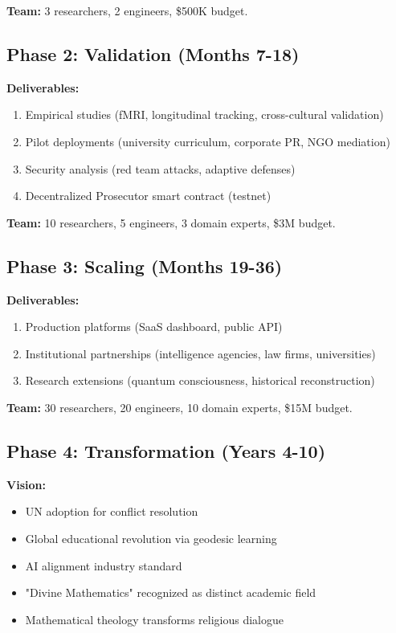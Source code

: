 \documentclass[11pt,a4paper]{article}
\theoremstyle{definition}
\theoremstyle{remark}
\begin{document}
\textbf{Team:} 3 researchers, 2 engineers, \$500K budget.

\subsection{Phase 2: Validation (Months 7-18)}

\textbf{Deliverables:}
\begin{enumerate}
\item Empirical studies (fMRI, longitudinal tracking, cross-cultural validation)
\item Pilot deployments (university curriculum, corporate PR, NGO mediation)
\item Security analysis (red team attacks, adaptive defenses)
\item Decentralized Prosecutor smart contract (testnet)
\end{enumerate}

\textbf{Team:} 10 researchers, 5 engineers, 3 domain experts, \$3M budget.

\subsection{Phase 3: Scaling (Months 19-36)}

\textbf{Deliverables:}
\begin{enumerate}
\item Production platforms (SaaS dashboard, public API)
\item Institutional partnerships (intelligence agencies, law firms, universities)
\item Research extensions (quantum consciousness, historical reconstruction)
\end{enumerate}

\textbf{Team:} 30 researchers, 20 engineers, 10 domain experts, \$15M budget.

\subsection{Phase 4: Transformation (Years 4-10)}

\textbf{Vision:}
\begin{itemize}
\item UN adoption for conflict resolution
\item Global educational revolution via geodesic learning
\item AI alignment industry standard
\item "Divine Mathematics" recognized as distinct academic field
\item Mathematical theology transforms religious dialogue
\end{itemize}
\end{document}
